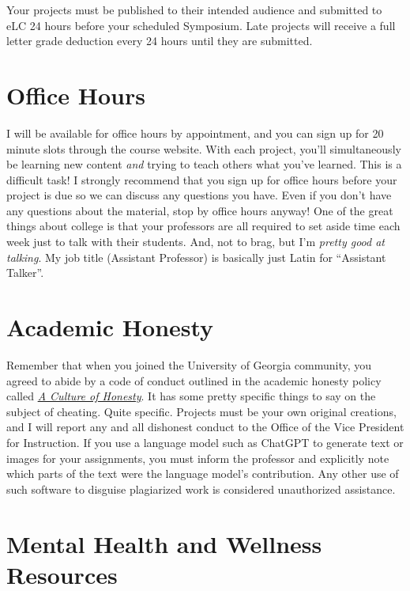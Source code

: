 \documentclass[11pt, letterpaper]{article}
\begin{document}
\noindent Your projects must be published to their intended audience and submitted to eLC 24 hours before your scheduled Symposium. Late projects will receive a full letter grade deduction every 24 hours until they are submitted.

\section*{Office Hours}

I will be available for office hours by appointment, and you can sign up for 20 minute slots through the course website. With each project, you'll simultaneously be learning new content \textit{and} trying to teach others what you've learned. This is a difficult task! I strongly recommend that you sign up for office hours before your project is due so we can discuss any questions you have. Even if you don't have any questions about the material, stop by office hours anyway! One of the great things about college is that your professors are all required to set aside time each week just to talk with their students. And, not to brag, but I'm \textit{pretty good at talking}. My job title (Assistant Professor) is basically just Latin for ``Assistant Talker''.




\section*{Academic Honesty}

Remember that when you joined the University of Georgia community, you agreed to abide by a code of conduct outlined in the academic honesty policy called \href{https://honesty.uga.edu/Academic-Honesty-Policy/Introduction/}{\textit{A Culture of Honesty}}. It has some pretty specific things to say on the subject of cheating. Quite specific. Projects must be your own original creations, and I will report any and all dishonest conduct to the Office of the Vice President for Instruction. If you use a language model such as ChatGPT to generate text or images for your assignments, you must inform the professor and explicitly note which parts of the text were the language model's contribution. Any other use of such software to disguise plagiarized work is considered unauthorized assistance.

\section*{Mental Health and Wellness Resources}
\end{document}
